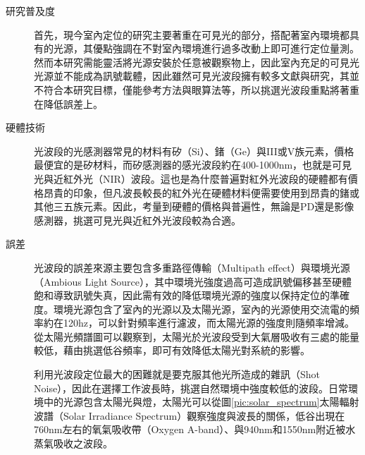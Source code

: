         \begin{description}
        \item[研究普及度]\hfill 

        首先，現今室內定位的研究主要著重在可見光的部分\cite{survey_light2018}，搭配著室內環境都具有的光源，其優點強調在不對室內環境進行過多改動上即可進行定位量測。然而本研究需能靈活將光源安裝於任意被觀察物上，因此室內充足的可見光光源並不能成為訊號載體，因此雖然可見光波段擁有較多文獻與研究，其並不符合本研究目標，僅能參考方法與眼算法等，所以挑選光波段重點將著重在降低誤差上。

        \item[硬體技術] \hfill 
        
        光波段的光感測器常見的材料有矽（Si）、鍺（Ge）與III或V族元素，價格最便宜的是矽材料，而矽感測器的感光波段約在400-1000nm，也就是可見光與近紅外光（NIR）波段。這也是為什麼普遍對紅外光波段的硬體都有價格昂貴的印象，但凡波長較長的紅外光在硬體材料便需要使用到昂貴的鍺或其他三五族元素\cite{si_pd}。因此，考量到硬體的價格與普遍性，無論是PD還是影像感測器，挑選可見光與近紅外光波段較為合適。


        \item[誤差] \hfill 
        

        光波段的誤差來源主要包含多重路徑傳輸（Multipath effect）與環境光源（Ambious Light Source）\cite{survey_light2020}，其中環境光強度過高可造成訊號偏移甚至硬體飽和導致訊號失真，因此需有效的降低環境光源的強度以保持定位的準確度。環境光源包含了室內的光源以及太陽光源，室內的光源使用交流電的頻率約在120hz，可以針對頻率進行濾波，而太陽光源的強度則隨頻率增減。從太陽光頻譜圖可以觀察到，太陽光於光波段受到大氣層吸收有三處的能量較低，藉由挑選低谷頻率，即可有效降低太陽光對系統的影響。

        利用光波段定位最大的困難就是要克服其他光所造成的雜訊（Shot Noise），因此在選擇工作波長時，挑選自然環境中強度較低的波段。日常環境中的光源包含太陽光與燈，太陽光可以從圖\ref{pic:solar_spectrum}太陽輻射波譜（Solar Irradiance Spectrum）觀察強度與波長的關係，低谷出現在760nm左右的氧氣吸收帶（Oxygen A-band）、與940nm和1550nm附近被水蒸氣吸收之波段\cite{book:solar_spectrum}。


\end{description}
